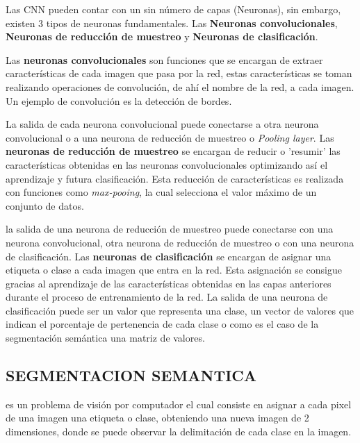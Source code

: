 Las CNN pueden contar con un sin número de capas (Neuronas), sin embargo, existen 3 tipos de neuronas fundamentales. Las \textbf{Neuronas convolucionales}, \textbf{Neuronas de reducción de muestreo} y \textbf{Neuronas de clasificación}.   

Las \textbf{neuronas convolucionales}  son funciones que se encargan de extraer características de cada imagen que pasa por la red, estas características se toman realizando operaciones de convolución, de ahí el nombre de la red, a cada imagen. Un ejemplo de convolución es la detección de bordes.  


La salida de cada neurona convolucional puede conectarse a otra neurona convolucional o a una neurona de reducción de muestreo o \textit{Pooling layer}. Las \textbf{neuronas de reducción de muestreo} se encargan de reducir o 'resumir' las características obtenidas en las neuronas convolucionales optimizando así el aprendizaje y futura clasificación. Esta reducción de características es realizada con funciones como \textit{max-pooing}, la cual selecciona el valor máximo de un conjunto de datos. 


la salida de una neurona de reducción de muestreo puede conectarse con una neurona convolucional, otra neurona de reducción de muestreo o con una neurona de clasificación. Las \textbf{neuronas de clasificación} se encargan de asignar una etiqueta o clase a cada imagen que entra en la red. Esta asignación se consigue gracias al aprendizaje de las características obtenidas en las capas anteriores durante el proceso de entrenamiento de la red. La salida de una neurona de clasificación puede ser un valor que representa una clase, un vector de valores que indican el porcentaje de pertenencia de cada clase o como es el caso de la segmentación semántica una matriz de valores. 

\subsection{SEGMENTACION SEMANTICA} es un problema de visión por computador el cual consiste en asignar a cada pixel de una imagen una etiqueta o clase, obteniendo una nueva imagen de 2 dimensiones, donde se puede observar la delimitación de cada clase en la imagen. 

